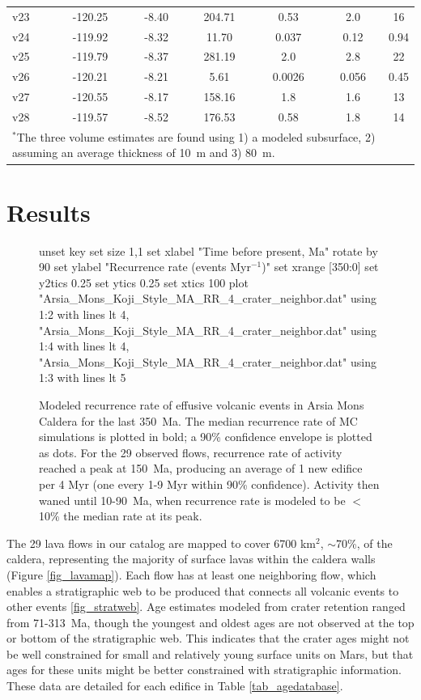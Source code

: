 \documentclass[12pt,letter]{article}
\begin{document}
\begin{table}[h!]
\begin{tabular}{l c c c c c c}
			v23 & -120.25 & -8.40 & 204.71 & 0.53 & 2.0 & 16\\
			v24 & -119.92 & -8.32 & 11.70 & 0.037 & 0.12 & 0.94\\
			v25 & -119.79 & -8.37 & 281.19 & 2.0 & 2.8 & 22\\
			v26 & -120.21 & -8.21 & 5.61 & 0.0026 & 0.056 & 0.45\\
			v27 & -120.55 & -8.17 & 158.16 & 1.8 & 1.6 & 13\\
			v28 & -119.57 & -8.52 & 176.53 & 0.58 & 1.8 & 14\\
		\bottomrule
		\multicolumn{6}{p{0.65\linewidth}}{$^*$The three volume estimates are found using 1) a modeled subsurface, 2) assuming an average thickness of 10~m and 3) 80~m.}
	\end{tabular}
	\label{tab_morphdatabase}
	\end{table}

\section{Results}

	\begin{figure}[h!]
		\centering
		\begin{gnuplot}[terminal=latex, terminaloptions=rotate]
			unset key
			set size 1,1
			set xlabel "Time before present, Ma" rotate by 90
			set ylabel "Recurrence rate (events Myr$^{-1}$)"
			set xrange [350:0]
			set y2tics 0.25
			set ytics 0.25
			set xtics 100
			plot "Arsia_Mons_Koji_Style_MA_RR_4_crater_neighbor.dat" using 1:2 with lines lt 4, "Arsia_Mons_Koji_Style_MA_RR_4_crater_neighbor.dat" using 1:4 with lines lt 4, "Arsia_Mons_Koji_Style_MA_RR_4_crater_neighbor.dat" using 1:3 with lines lt 5
		\end{gnuplot}
		\caption{Modeled recurrence rate of effusive volcanic events in Arsia Mons Caldera for the last 350~Ma. The median recurrence rate of MC simulations is plotted in bold; a 90\% confidence envelope is plotted as dots. For the 29 observed flows, recurrence rate of activity reached a peak at 150~Ma, producing an average of 1 new edifice per 4 Myr (one every 1-9 Myr within 90\% confidence). Activity then waned until 10-90~Ma, when recurrence rate is modeled to be $<$10\% the median rate at its peak.}
		\label{fig_VERRMRR}
	\end{figure}
	
The 29 lava flows in our catalog are mapped to cover 6700 km$^2$, $\sim$70\%, of the caldera, representing the majority of surface lavas within the caldera walls (Figure \ref{fig_lavamap}). Each flow has at least one neighboring flow, which enables a stratigraphic web to be produced that connects all volcanic events to other events \ref{fig_stratweb}. Age estimates modeled from crater retention ranged from 71-313~Ma, though the youngest and oldest ages are not observed at the top or bottom of the stratigraphic web. This indicates that the crater ages might not be well constrained for small and relatively young surface units on Mars, but that ages for these units might be better constrained with stratigraphic information. These data are detailed for each edifice in Table \ref{tab_agedatabase}.
	
\end{document}
